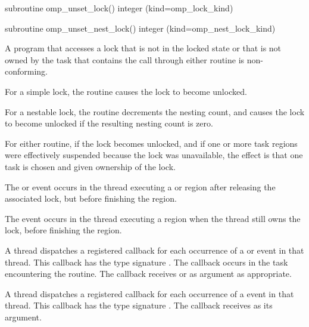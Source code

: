 \begin{fortranspecific}
\begin{ompfSubroutine}
subroutine omp_unset_lock()
integer (kind=omp_lock_kind) 

subroutine omp_unset_nest_lock()
integer (kind=omp_nest_lock_kind) 
\end{ompfSubroutine}
\end{fortranspecific}

\constraints
A program that accesses a lock that is not in the locked state or that is
not owned by the task that contains the call through either routine is
non-conforming.


\effect
For a simple lock, the  routine causes the lock to become unlocked.

For a nestable lock, the  routine decrements the nesting
count, and causes the lock to become unlocked if the resulting nesting count is zero.

For either routine, if the lock becomes unlocked, and if one or more task
regions were effectively suspended because the lock was unavailable, the
effect is that one task is chosen and given ownership of the lock.

\events

The  or  event occurs in the thread
executing a  or  region
after releasing the associated lock, but before finishing the region.

The  event occurs in the thread
executing a  region
when the thread still owns the lock,
before finishing the region.


\tools

A thread dispatches a registered 
callback for each occurrence of a  or  event
in that thread.  This callback has the type signature .
The callback occurs in the task encountering
the routine. The callback receives  or
  as  argument as appropriate.

A thread dispatches a registered 
callback for each occurrence of a  event
in that thread. This callback has the type signature .
The callback receives  as its  argument.

